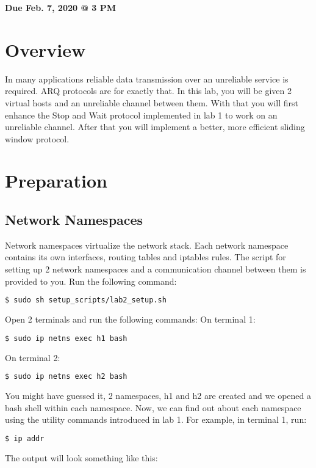 \documentclass[11pt]{article}
\makeatletter
\def\datedue{Feb. 7, 2020 @ 3 PM}
\makeatother
\begin{document}
\maketitle \thispagestyle{fancy}
\hfill {\large \textbf{Due \datedue}}


\section{Overview}
\label{sec:overview}
In many applications reliable data transmission over an unreliable service is required. ARQ protocols are for exactly that. In this lab, you will be given 2 virtual hosts and an unreliable channel between them. With that you will first enhance the Stop and Wait protocol implemented in lab 1 to work on an unreliable channel. After that you will implement a better, more efficient sliding window protocol.

\section{Preparation}
\label{sec:preparation}
\subsection{Network Namespaces}
Network namespaces virtualize the network stack. Each network namespace contains its own interfaces, routing tables and iptables rules. The script for setting up 2 network namespaces and a communication channel between them is provided to you. Run the following command:
\begin{lstlisting}[language=bash]
$ sudo sh setup_scripts/lab2_setup.sh
\end{lstlisting}
Open 2 terminals and run the following commands:
On terminal 1:
\begin{lstlisting}[language=bash]
$ sudo ip netns exec h1 bash
\end{lstlisting}
On terminal 2:
\begin{lstlisting}[language=bash]
$ sudo ip netns exec h2 bash
\end{lstlisting}
You might have guessed it, 2 namespaces, h1 and h2 are created and we opened a bash shell within each namespace. Now, we can find out about each namespace using the utility commands introduced in lab 1. For example, in terminal 1, run:
\begin{lstlisting}[language=bash]
$ ip addr
\end{lstlisting}
The output will look something like this:
\end{document}
